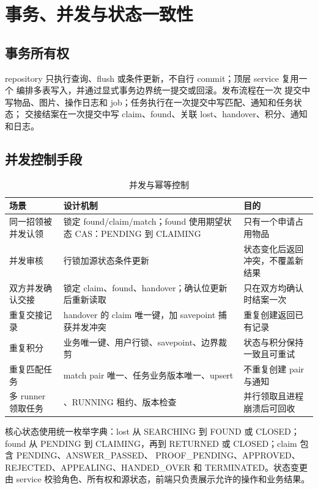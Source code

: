 \section{事务、并发与状态一致性}

\subsection{事务所有权}

repository 只执行查询、flush 或条件更新，不自行 commit；顶层 service 复用一个
 编排多表写入，并通过显式事务边界统一提交或回滚。发布流程在一次
提交中写物品、图片、操作日志和 job；任务执行在一次提交中写匹配、通知和任务状态；
交接结案在一次提交中写 claim、found、关联 lost、handover、积分、通知和日志。

\subsection{并发控制手段}

\begin{table}[H]
  \centering
  \caption{并发与幂等控制}
  \begin{tabularx}{\textwidth}{L{3.3cm}Y Y}
    \toprule
    场景 & 设计机制 & 目的 \\
    \midrule
    同一招领被并发认领 & 锁定 found/claim/match；found 使用期望状态 CAS：PENDING 到 CLAIMING & 只有一个申请占用物品 \\
    并发审核 & 行锁加源状态条件更新 & 状态变化后返回冲突，不覆盖新结果 \\
    双方并发确认交接 & 锁定 claim、found、handover；确认位更新后重新读取 & 只在双方均确认时结案一次 \\
    重复交接记录 & handover 的 claim 唯一键，加 savepoint 捕获并发冲突 & 重复创建返回已有记录 \\
    重复积分 & 业务唯一键、用户行锁、savepoint、边界裁剪 & 状态与积分保持一致且可重试 \\
    重复匹配任务 & match pair 唯一、任务业务版本唯一、upsert & 不重复创建 pair 与通知 \\
    多 runner 领取任务 & 、RUNNING 租约、版本检查 & 并行领取且进程崩溃后可回收 \\
    \bottomrule
  \end{tabularx}
\end{table}

核心状态使用统一枚举字典：lost 从 SEARCHING 到 FOUND 或 CLOSED；
found 从 PENDING 到 CLAIMING，再到 RETURNED 或 CLOSED；claim 包含 PENDING、ANSWER\_PASSED、
PROOF\_PENDING、APPROVED、REJECTED、APPEALING、HANDED\_OVER 和 TERMINATED。状态变更由
service 校验角色、所有权和源状态，前端只负责展示允许的操作和业务结果。

